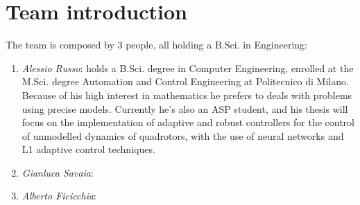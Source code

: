 \chapter*{Team introduction}

The team is composed by 3 people, all holding a B.Sci. in Engineering: 
\begin{enumerate}
\item \emph{Alessio Russo}: holds a B.Sci. degree in Computer Engineering, enrolled at the M.Sci. degree Automation and Control Engineering at Politecnico di Milano. Because of his high interest in mathematics he prefers to deals with problems using precise models. Currently he's also an ASP student, and his thesis will focus on the implementation of adaptive and robust controllers for the control of unmodelled dynamics of quadrotors, with the use of neural networks and L1 adaptive control techniques. 
\item \emph{Gianluca Savaia}:
\item \emph{Alberto Ficicchia}:
\end{enumerate}